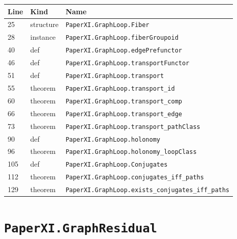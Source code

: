 \documentclass[10pt,oneside]{book}
\begin{document}
\begin{longtable}{@{}p{}p{}p{}@{}}\toprule Line&Kind&Name\\\midrule\endhead

25&structure&\nolinkurl{PaperXI.GraphLoop.Fiber}\\

28&instance&\nolinkurl{PaperXI.GraphLoop.fiberGroupoid}\\

40&def&\nolinkurl{PaperXI.GraphLoop.edgePrefunctor}\\

46&def&\nolinkurl{PaperXI.GraphLoop.transportFunctor}\\

51&def&\nolinkurl{PaperXI.GraphLoop.transport}\\

55&theorem&\nolinkurl{PaperXI.GraphLoop.transport_id}\\

60&theorem&\nolinkurl{PaperXI.GraphLoop.transport_comp}\\

66&theorem&\nolinkurl{PaperXI.GraphLoop.transport_edge}\\

73&theorem&\nolinkurl{PaperXI.GraphLoop.transport_pathClass}\\

90&def&\nolinkurl{PaperXI.GraphLoop.holonomy}\\

96&theorem&\nolinkurl{PaperXI.GraphLoop.holonomy_loopClass}\\

105&def&\nolinkurl{PaperXI.GraphLoop.Conjugates}\\

112&theorem&\nolinkurl{PaperXI.GraphLoop.conjugates_iff_paths}\\

129&theorem&\nolinkurl{PaperXI.GraphLoop.exists_conjugates_iff_paths}\\

\bottomrule\end{longtable}

\section{\texorpdfstring{\nolinkurl{PaperXI.GraphResidual}}{PaperXI.GraphResidual}}\label{module:PaperXI.GraphResidual}
\end{document}
